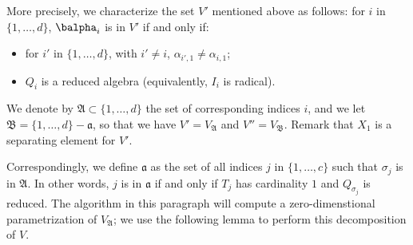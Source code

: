 \documentclass[12pt]{article}
\begin{document}
More precisely, we characterize the set $V'$ mentioned above as follows: for $i$ in
$\{1,\dots,d\}$, $\balpha_i$ is in $V'$ if and only if:
\begin{itemize}
\item for $i'$ in $\{1,\dots,d\}$, with $i'\ne i$, $\alpha_{i',1} \ne
  \alpha_{i,1}$;
\item $Q_i$ is a reduced algebra (equivalently, $I_i$ is radical).
\end{itemize}
We denote by $\mathfrak{A}\subset \{1,\dots,d\}$ the set of
corresponding indices $i$, and we let
$\mathfrak{B}=\{1,\dots,d\}-\mathfrak{a}$, so that we have
$V'=V_{\mathfrak{A}}$ and $V''=V_{\mathfrak{B}}$.  Remark that $X_1$
is a separating element for $V'$.

Correspondingly, we define $\mathfrak{a}$ as the set of all indices
$j$ in $\{1,\dots,c\}$ such that $\sigma_j$ is in $\mathfrak{A}$. In
other words, $j$ is in $\mathfrak{a}$ if and only if $T_j$ has
cardinality $1$ and $Q_{\sigma_j}$ is reduced.  The algorithm in this
paragraph will compute a zero-dimenstional parametrization of
$V_{\mathfrak{A}}$; we use the following lemma to perform this
decomposition of $V$.
\end{document}
